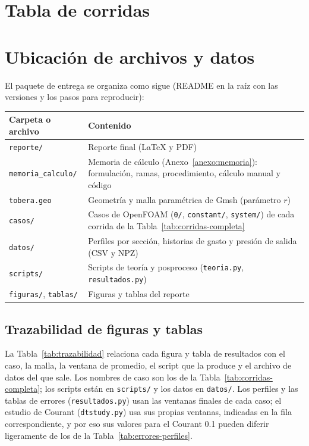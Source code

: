 \documentclass[12pt,letterpaper]{article}
\numberwithin{equation}{section}
\begin{document}
\appendix
\section{Tabla de corridas}
\label{anexo:corridas}



\section{Ubicación de archivos y datos}
\label{anexo:archivos}

El paquete de entrega se organiza como sigue (README en la raíz con las versiones y los pasos para reproducir):

\begin{table}[H]
\centering
\renewcommand{\arraystretch}{1.2}
\small
\begin{tabular}{lp{10cm}}
\toprule
\textbf{Carpeta o archivo} & \textbf{Contenido} \\
\midrule
\texttt{reporte/} & Reporte final (\LaTeX{} y PDF) \\
\texttt{memoria\_calculo/} & Memoria de cálculo (Anexo~\ref{anexo:memoria}): formulación, ramas, procedimiento, cálculo manual y código \\
\texttt{tobera.geo} & Geometría y malla paramétrica de Gmsh (parámetro $r$) \\
\texttt{casos/} & Casos de OpenFOAM (\texttt{0/}, \texttt{constant/}, \texttt{system/}) de cada corrida de la Tabla~\ref{tab:corridas-completa} \\
\texttt{datos/} & Perfiles por sección, historias de gasto y presión de salida (CSV y NPZ) \\
\texttt{scripts/} & Scripts de teoría y posproceso (\texttt{teoria.py}, \texttt{resultados.py}) \\
\texttt{figuras/}, \texttt{tablas/} & Figuras y tablas del reporte \\
\bottomrule
\end{tabular}
\end{table}

\subsection*{Trazabilidad de figuras y tablas}

La Tabla~\ref{tab:trazabilidad} relaciona cada figura y tabla de resultados con el caso, la malla, la ventana de promedio, el script que la produce y el archivo de datos del que sale. Los nombres de caso son los de la Tabla~\ref{tab:corridas-completa}; los scripts están en \texttt{scripts/} y los datos en \texttt{datos/}. Los perfiles y las tablas de errores (\texttt{resultados.py}) usan las ventanas finales de cada caso; el estudio de Courant (\texttt{dtstudy.py}) usa sus propias ventanas, indicadas en la fila correspondiente, y por eso sus valores para el Courant 0.1 pueden diferir ligeramente de los de la Tabla~\ref{tab:errores-perfiles}.
\end{document}
